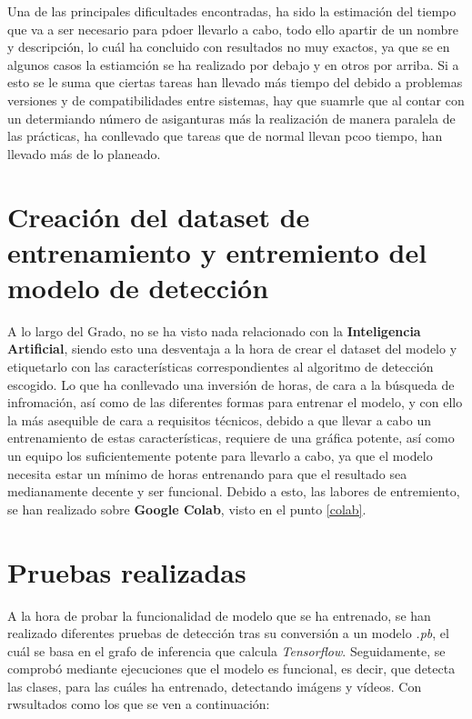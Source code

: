 Una de las principales dificultades encontradas, ha sido la estimación del tiempo que va a ser necesario para pdoer llevarlo a cabo, todo ello apartir de un nombre y descripción, lo cuál ha concluido con resultados no muy exactos, ya que se en algunos casos la estiamción se ha realizado por debajo y en otros por arriba. Si a esto se le suma que ciertas tareas han llevado más tiempo del debido a problemas versiones y de compatibilidades entre sistemas, hay que suamrle que al contar con un determiando número de asiganturas
más la realización de manera paralela de las prácticas, ha conllevado que tareas que de normal llevan pcoo tiempo, han llevado más de lo planeado.

\section{Creación del dataset de entrenamiento y entremiento del modelo de detección}
A lo largo del Grado, no se ha visto nada relacionado con la \textbf{Inteligencia Artificial}, siendo esto una desventaja a la hora de crear el dataset del modelo y etiquetarlo con las características correspondientes al algoritmo de detección escogido. Lo que ha conllevado una inversión de horas, de cara a la búsqueda de infromación, así como de las diferentes formas para entrenar el modelo, y con ello la más asequible de cara a requisitos técnicos, debido a que llevar a cabo un entrenamiento de estas características, 
requiere de una gráfica potente, así como un equipo los suficientemente potente para llevarlo a cabo, ya que el modelo necesita estar un mínimo de horas entrenando para que el resultado sea medianamente decente y ser funcional.
Debido a esto, las labores de entremiento, se han realizado sobre \textbf{Google Colab}, visto en el punto \ref{colab}.

\section{Pruebas realizadas}
A la hora de probar la funcionalidad de modelo que se ha entrenado, se han realizado diferentes pruebas de detección tras su conversión a un modelo \textit{.pb}, el cuál se basa en el grafo de inferencia que calcula \textit{Tensorflow}.
Seguidamente, se comprobó mediante ejecuciones que el modelo es funcional, es decir, que detecta las clases, para las cuáles ha entrenado, detectando imágens y vídeos.
Con rwsultados como los que se ven a continuación:


